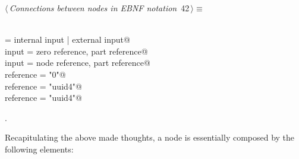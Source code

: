 \documentclass[
    a4paper,      %
    10pt,         %
    openright,    %
    notitlepage,  %
    parskip=half, %
]{scrreprt}       %
\theoremstyle{definition}                    %
\begin{document}
\begin{flushleft} \small
\begin{minipage}{\linewidth}\label{scrap53}\raggedright\small
{} $\langle\,${\itshape Connections between nodes in EBNF notation}\nobreak\ {\footnotesize {42}}$\,\rangle\equiv$
\vspace{-1exm}
\begin{list}{}{} \item
\mbox{}\lstinline@@\\
\mbox{}\lstinline@input = internal input | external input@\\
\mbox{}\lstinline@internal input = zero reference, part reference@\\
\mbox{}\lstinline@external input = node reference, part reference@\\
\mbox{}\lstinline@zero reference = "0"@\\
\mbox{}\lstinline@node reference = "uuid4"@\\
\mbox{}\lstinline@part reference = "uuid4"@\\
\mbox{}\lstinline@@{\NWsep}
\end{list}
\vspace{-1.5ex}
\footnotesize
\begin{list}{}{\setlength{\itemsep}{-\parsep}\setlength{\itemindent}{-\leftmargin}}
\item {\NWtxtMacroNoRef}.

\item{}
\end{list}
\end{minipage}\vspace{4ex}
\end{flushleft}
%

Recapitulating the above made thoughts, a node is essentially composed by the
following elements:
\end{document}
